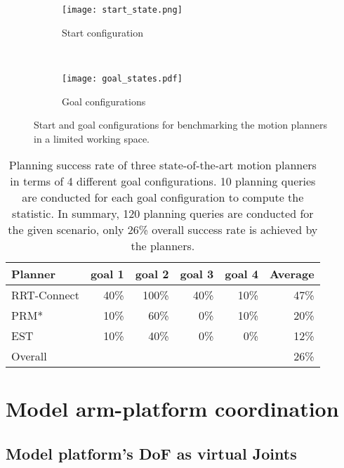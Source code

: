 \begin{figure}[!htbp]
\captionsetup[subfigure]{position=b}
    \centering
    \begin{subfigure}[t]{0.18\textwidth}
        \texttt{[image: start\_state.png]}
        \caption{Start configuration }
        \label{fig:start_state}
    \end{subfigure}
    ~ %
    \begin{subfigure}[t]{0.72\textwidth}
        \texttt{[image: goal\_states.pdf]}
        \caption{Goal configurations}
        \label{fig:goal_states}
    \end{subfigure}
    \caption{Start and goal configurations for benchmarking the motion planners in a limited working space.}\label{fig:moveit_planning}
\end{figure} 

\begin{table}[!htbp]
\centering
\begin{tabular}{lrrrr|r}
Planner     & goal 1 & goal 2 & goal 3 & goal 4 & Average \\ 
\hline
\hline
RRT-Connect & 40\%   & 100\%  & 40\%   & 10\%   & 47\%    \\
PRM*        & 10\%   & 60\%   & 0\%    & 10\%   & 20\%    \\
EST         & 10\%   & 40\%   & 0\%    & 0\%    & 12\%    \\ \hline
Overall     &        &        &        &        & 26\%   
\end{tabular}
\caption{Planning success rate of three state-of-the-art motion planners in terms of 4 different goal configurations. 10 planning queries are conducted for each goal configuration to compute the statistic. In summary, 120 planning queries are conducted for the given scenario, only 26\% overall success rate is achieved by the planners. } 
\label{tab:benchmark_result}
\end{table}

\section{Model arm-platform coordination}

\subsection{Model platform's DoF as virtual Joints}

